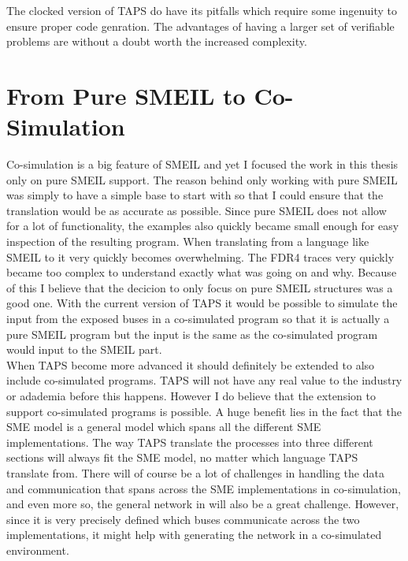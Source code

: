 
The clocked version of TAPS do have its pitfalls which require some ingenuity to ensure proper code genration. The advantages of having a larger set of verifiable problems are without a doubt worth the increased complexity.
\section{From Pure SMEIL to Co-Simulation}
Co-simulation is a big feature of SMEIL and yet I focused the work in this thesis only on pure SMEIL support. The reason behind only working with pure SMEIL was simply to have a simple base to start with so that I could ensure that the translation would be as accurate as possible. Since pure SMEIL does not allow for a lot of functionality, the examples also quickly became small enough for easy inspection of the resulting \cspm{} program. When translating from a language like SMEIL to \cspm{} it very quickly becomes overwhelming. The FDR4 traces very quickly became too complex to understand exactly what was going on and why. Because of this I believe that the decicion to only focus on pure SMEIL structures was a good one.
With the current version of TAPS it would be possible to simulate the input from the exposed buses in a co-simulated program so that it is actually a pure SMEIL program but the input is the same as the co-simulated program would input to the SMEIL part.\\

When TAPS become more advanced it should definitely be extended to also include co-simulated programs. TAPS will not have any real value to the industry or adademia before this happens. However I do believe that the extension to support co-simulated programs is possible. A huge benefit lies in the fact that the SME model is a general model which spans all the different SME implementations. The way TAPS translate the processes into three different sections will always fit the SME model, no matter which language TAPS translate from.
There will of course be a lot of challenges in handling the data and communication that spans across the SME implementations in co-simulation, and even more so, the general network in \cspm{} will also be a great challenge. However, since it is very precisely defined which buses communicate across the two implementations, it might help with generating the \cspm{} network in a co-simulated environment.\\

